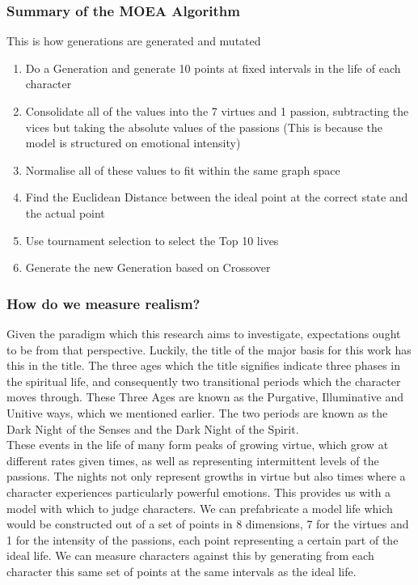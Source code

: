 \documentclass[12pt]{article}
\begin{document}
\subsubsection{Summary of the MOEA Algorithm}
This is how generations are generated and mutated\:
\begin{enumerate}
	\item Do a Generation and generate 10 points at fixed intervals in the life of each character
	\item Consolidate all of the values into the 7 virtues and 1 passion, subtracting the vices but taking the absolute values of the passions (This is because the model is structured on emotional intensity)
	\item Normalise all of these values to fit within the same graph space
	\item Find the Euclidean Distance between the ideal point at the correct state and the actual point
	\item Use tournament selection to select the Top 10 lives
	\item Generate the new Generation based on Crossover
\end{enumerate}

\subsubsection{How do we measure realism?}
Given the paradigm which this research aims to investigate, expectations ought to be from that perspective. Luckily, the title of the major basis for this work has this in the title. The three ages which the title signifies indicate three phases in the spiritual life, and consequently two transitional periods which the character moves through. These Three Ages are known as the Purgative, Illuminative and Unitive ways, which we mentioned earlier. The two periods are known as the Dark Night of the Senses and the Dark Night of the Spirit. \\
These events in the life of many form peaks of growing virtue, which grow at different rates given times, as well as representing intermittent levels of the passions. The nights not only represent growths in virtue but also times where a character experiences particularly powerful emotions. This provides us with a model with which to judge characters. We can prefabricate a model life which would be constructed out of a set of points in 8 dimensions, 7 for the virtues and 1 for the intensity of the passions, each point representing a certain part of the ideal life. We can measure characters against this by generating from each character this same set of points at the same intervals as the ideal life. \\
\end{document}
